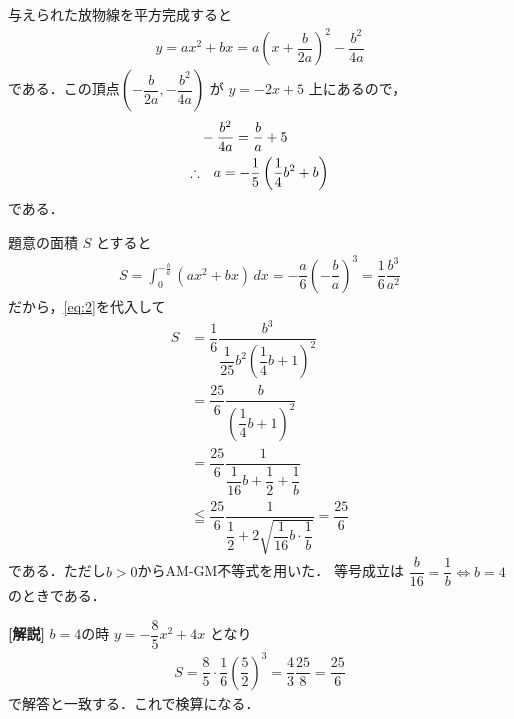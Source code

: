 \documentclass[../../main.tex]{subfiles}
\begin{document}
与えられた放物線を平方完成すると
\begin{align}
  y = ax^2 + bx = a\left(x+\dfrac{b}{2a}\right)^2 - \dfrac{b^2}{4a} \label{eq:1}
\end{align}
である．この頂点$\left(-\dfrac{b}{2a}, -\dfrac{b^2}{4a}\right)$ が
$y=-2x+5$ 上にあるので，
\begin{align}
  & -\dfrac{b^2}{4a} = \dfrac{b}{a} + 5 \notag \\
  \therefore
  &\quad a = -\dfrac{1}{5} \left( \dfrac{1}{4} b^2 + b \right) \label{eq:2}
\end{align}
である．

題意の面積 $S$ とすると
\begin{align}
  S = \int_{0}^{-\frac{b}{a}} (ax^2 + bx) \,dx
  = -\dfrac{a}{6} \left(-\dfrac{b}{a}\right)^3
  = \dfrac{1}{6} \dfrac{b^3}{a^2}
\end{align}
だから，\cref{eq:2}を代入して
\begin{align}
  S
  &= \dfrac{1}{6} \dfrac{b^3}{\dfrac{1}{25} b^2\left(\dfrac{1}{4}b+1\right)^2} \\
  &= \dfrac{25}{6} \dfrac{b}{\left(\dfrac{1}{4}b+1\right)^2} \\
  &= \dfrac{25}{6} \dfrac{1}{\dfrac{1}{16}b + \dfrac{1}{2} + \dfrac{1}{b}} \\
  &\leqq \dfrac{25}{6} \dfrac{1}{\dfrac{1}{2} + 2\sqrt{\dfrac{1}{16}b \cdot \dfrac{1}{b}}} = \dfrac{25}{6}
\end{align}
である．ただし$b>0$からAM-GM不等式を用いた．
等号成立は $\dfrac{b}{16} = \dfrac{1}{b} \iff b=4$ のときである．

{\bf [解説]}
$b=4$の時 $y=-\dfrac{8}{5}x^2+4x$ となり
\begin{align}
  S = \dfrac{8}{5} \cdot \dfrac{1}{6} \left(\dfrac{5}{2}\right)^3 = \dfrac{4}{3} \dfrac{25}{8} = \dfrac{25}{6}
\end{align}
で解答と一致する．これで検算になる．
\end{document}
